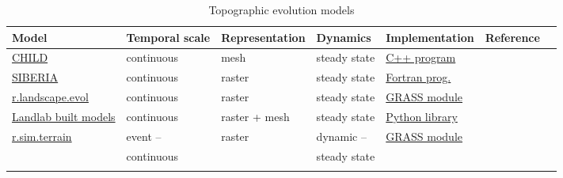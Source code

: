 \documentclass[gmd, manuscript]{copernicus}
\begin{document}
\begin{table}
\small
\caption{Topographic evolution models}
\begin{tabu} to \textwidth {lXXXXll}
\toprule
Model &  Temporal scale & Representation & Dynamics & Implementation & Reference\\
\midrule
\href{https://csdms.colorado.edu/wiki/Model:CHILD}{CHILD} & continuous & mesh & steady state & \href{https://csdms.colorado.edu/wiki/Model:CHILD}{C++ program} & \citep{Tucker2001}\\
\href{https://csdms.colorado.edu/wiki/Model:SIBERIA}{SIBERIA} & continuous & raster & steady state & \href{https://csdms.colorado.edu/wiki/Model:SIBERIA}{Fortran prog.} & \citep{Willgoose2005}\\
\href{https://grass.osgeo.org/grass74/manuals/addons/r.landscape.evol.html}{r.landscape.evol} & continuous & raster &  steady state & \href{https://grass.osgeo.org/grass74/manuals/addons/r.landscape.evol.html}{GRASS module} & \citep{Barton2010}\\
\href{https://github.com/landlab/}{Landlab built models} & continuous & raster + mesh & steady state & \href{https://github.com/landlab/}{Python library} & \citep{Hobley2017}\\
\href{https://github.com/baharmon/landscape_evolution}{r.sim.terrain}  & event -- & raster & dynamic -- & \href{https://github.com/baharmon/landscape_evolution}{GRASS module} &\\
& continuous && steady state & &\\
\bottomrule
\\
\end{tabu}
\label{table:evolution_models} 
\end{table}

\end{document}

